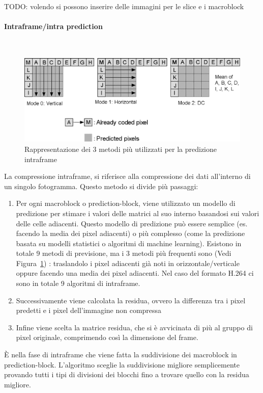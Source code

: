 \documentclass[a4paper,12pt, oneside]{article}
\begin{document}
TODO: volendo si possono inserire delle immagini per le slice e i macroblock

\paragraph{Intraframe/intra prediction}\hphantom{A}\\
\begin{figure}[h]
    \centering
    \includegraphics[width=1\textwidth]{images/intraframe-algo.png}
    \caption{Rappresentazione dei 3 metodi più utilizzati per la predizione intraframe}
    \label{fig:intraframe_algo}
\end{figure}

\noindent La compressione intraframe, si riferisce alla compressione dei dati all'interno di
un singolo fotogramma. Questo metodo si divide più passaggi:
\begin{enumerate}
  \item Per ogni macroblock o prediction-block, viene utilizzato un modello di predizione per stimare
  i valori delle matrici al suo interno basandosi sui valori delle celle adiacenti. Questo modello di
  predizione può essere semplice (es. facendo la media dei pixel adiacenti) o più complesso (come la
  predizione basata su modelli statistici o algoritmi di machine learning). Esistono in totale 9 metodi
  di previsione, ma i 3 metodi più frequenti sono (Vedi Figura~\ref{fig:intraframe_algo}) : traslandolo
  i pixel adiacenti già noti in orizzontale/verticale oppure facendo una media dei pixel adiacenti. Nel
  caso del formato H.264 ci sono in totale 9 algoritmi di intraframe.
  \item Successivamente viene calcolata la residua, ovvero la differenza tra i pixel predetti e i
  pixel dell'immagine non compressa
  \item Infine viene scelta la matrice residua, che si è avvicinata di più al gruppo di pixel originale,
  comprimendo così la dimensione del frame.
\end{enumerate}
È nella fase di intraframe che viene fatta la suddivisione dei macroblock in prediction-block.
L'algoritmo sceglie la suddivisione migliore semplicemente provando tutti i tipi di divisioni dei
blocchi fino a trovare quello con la residua migliore.
\end{document}

